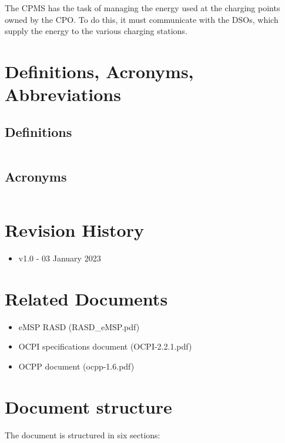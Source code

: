 The CPMS has the task of managing the energy used at the charging points owned by the CPO. To do this, it must communicate with the DSOs, which supply the energy to the various charging stations.



\section{Definitions, Acronyms, Abbreviations}

\subsection{Definitions}

\begin{tabular}{|p{5cm}|p{10cm}|}
	\hline
	\hline
\end{tabular}

\subsection{Acronyms}
\begin{tabular}{|l|l|}
	\hline
	\hline
\end{tabular}

\section{Revision History}
\begin{itemize}
	\item v1.0 - 03 January 2023
\end{itemize}

\section{Related Documents}
\begin{itemize}
	\item {eMSP RASD (RASD\_eMSP.pdf)}
	\item OCPI specifications document (OCPI-2.2.1.pdf)
	\item OCPP document (ocpp-1.6.pdf)
\end{itemize}

\section{Document structure}
The document is structured in six sections:

